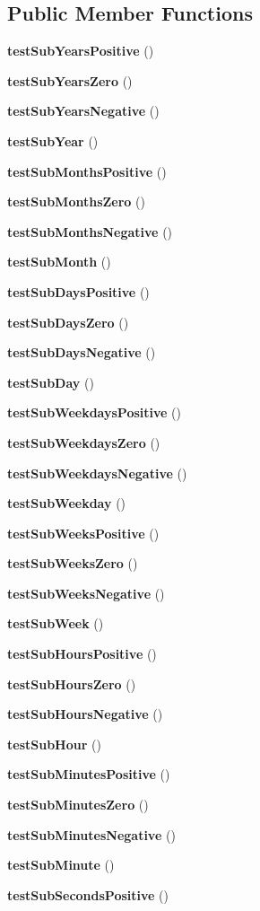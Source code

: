 \subsection*{Public Member Functions}
\begin{DoxyCompactItemize}
\item 
{\bf test\+Sub\+Years\+Positive} ()
\item 
{\bf test\+Sub\+Years\+Zero} ()
\item 
{\bf test\+Sub\+Years\+Negative} ()
\item 
{\bf test\+Sub\+Year} ()
\item 
{\bf test\+Sub\+Months\+Positive} ()
\item 
{\bf test\+Sub\+Months\+Zero} ()
\item 
{\bf test\+Sub\+Months\+Negative} ()
\item 
{\bf test\+Sub\+Month} ()
\item 
{\bf test\+Sub\+Days\+Positive} ()
\item 
{\bf test\+Sub\+Days\+Zero} ()
\item 
{\bf test\+Sub\+Days\+Negative} ()
\item 
{\bf test\+Sub\+Day} ()
\item 
{\bf test\+Sub\+Weekdays\+Positive} ()
\item 
{\bf test\+Sub\+Weekdays\+Zero} ()
\item 
{\bf test\+Sub\+Weekdays\+Negative} ()
\item 
{\bf test\+Sub\+Weekday} ()
\item 
{\bf test\+Sub\+Weeks\+Positive} ()
\item 
{\bf test\+Sub\+Weeks\+Zero} ()
\item 
{\bf test\+Sub\+Weeks\+Negative} ()
\item 
{\bf test\+Sub\+Week} ()
\item 
{\bf test\+Sub\+Hours\+Positive} ()
\item 
{\bf test\+Sub\+Hours\+Zero} ()
\item 
{\bf test\+Sub\+Hours\+Negative} ()
\item 
{\bf test\+Sub\+Hour} ()
\item 
{\bf test\+Sub\+Minutes\+Positive} ()
\item 
{\bf test\+Sub\+Minutes\+Zero} ()
\item 
{\bf test\+Sub\+Minutes\+Negative} ()
\item 
{\bf test\+Sub\+Minute} ()
\item 
{\bf test\+Sub\+Seconds\+Positive} ()
\item 

\end{DoxyCompactItemize}
